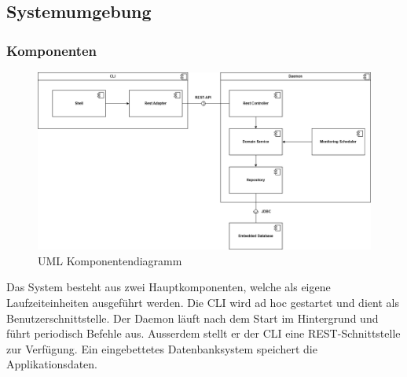 \documentclass[a4paper,12pt]{report}
\begin{document}
    \subsection{Systemumgebung}

    \subsubsection{Komponenten}


    \begin{figure}[h]
        \centering
        \includegraphics[width=1\textwidth]{assets/comp-diag-tracesentry-v2}
        \caption{UML Komponentendiagramm}
        \label{fig:comp-diag}
    \end{figure}

    \textnormal{Das System besteht aus zwei Hauptkomponenten, welche als eigene Laufzeiteinheiten ausgeführt werden.
    Die CLI wird ad hoc gestartet und dient als Benutzerschnittstelle.
    Der Daemon läuft nach dem Start im Hintergrund und führt periodisch Befehle aus. Ausserdem stellt er der
    CLI eine REST-Schnittstelle zur Verfügung.
    Ein eingebettetes Datenbanksystem speichert die Applikationsdaten.}
\end{document}
